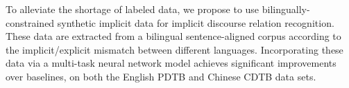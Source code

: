 To alleviate the shortage of labeled data, we propose to use bilingually-constrained synthetic implicit data for implicit discourse relation recognition. These data are extracted from a bilingual sentence-aligned corpus according to the implicit/explicit mismatch between different languages. Incorporating these data via a multi-task neural network model achieves significant improvements over baselines, on both the English PDTB and Chinese CDTB data sets.
